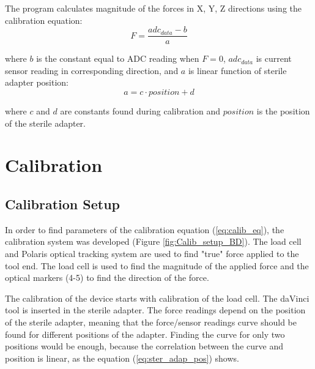 The program calculates magnitude of the forces in X, Y, Z directions using the calibration equation:
\begin{equation}\label{eq:calib_eq}
F = \frac{adc_{data} - b}{a}
\end{equation}

where $b$ is the constant equal to ADC reading when $F = 0$, $adc_{data}$ is current sensor reading in corresponding direction, and $a$ is linear function of sterile adapter position:
\begin{equation}\label{eq:ster_adap_pos}
a = c \cdot position + d
\end{equation}

where $c$ and $d$ are constants found during calibration and $position$ is the position of the sterile adapter.
 
	
\section{Calibration}
\label{section:Calibration}

	\subsection{Calibration Setup}
	\label{sec:CalSetup}
	In order to find parameters of the calibration equation (\ref{eq:calib_eq}), the calibration system was developed (Figure \ref{fig:Calib_setup_BD}). The load cell and Polaris optical tracking system are used to find "true" force applied to the tool end. The load cell is used to find the magnitude of the applied force and the optical markers (4-5) to find the direction of the force.
	
	The calibration of the device starts with calibration of the load cell. The daVinci tool is inserted in the sterile adapter.  The force readings depend on the position of the sterile adapter, meaning that the force/sensor readings curve should be found for different positions of the adapter. Finding the curve for only two positions would be enough, because the correlation between the curve and position is linear, as the equation (\ref{eq:ster_adap_pos}) shows. 
	
